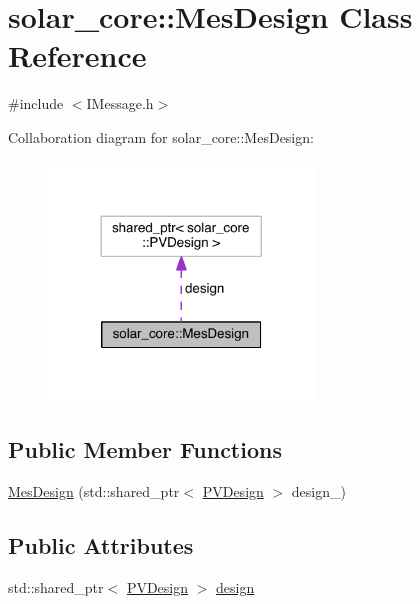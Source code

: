 \hypertarget{classsolar__core_1_1_mes_design}{}\section{solar\+\_\+core\+:\+:Mes\+Design Class Reference}
\label{classsolar__core_1_1_mes_design}


{\ttfamily \#include $<$I\+Message.\+h$>$}



Collaboration diagram for solar\+\_\+core\+:\+:Mes\+Design\+:\nopagebreak
\begin{figure}[H]
\begin{center}
\leavevmode
\includegraphics[width=200pt]{classsolar__core_1_1_mes_design__coll__graph}
\end{center}
\end{figure}
\subsection*{Public Member Functions}
\begin{DoxyCompactItemize}
\item 
\hyperlink{classsolar__core_1_1_mes_design_a29c0de1da8ebd663d94c02bc65ef8539}{Mes\+Design} (std\+::shared\+\_\+ptr$<$ \hyperlink{classsolar__core_1_1_p_v_design}{P\+V\+Design} $>$ design\+\_\+)
\end{DoxyCompactItemize}
\subsection*{Public Attributes}
\begin{DoxyCompactItemize}
\item 
std\+::shared\+\_\+ptr$<$ \hyperlink{classsolar__core_1_1_p_v_design}{P\+V\+Design} $>$ \hyperlink{classsolar__core_1_1_mes_design_a85bd3d4d32c763ac3f9c6547ab4002ab}{design}
\end{DoxyCompactItemize}


